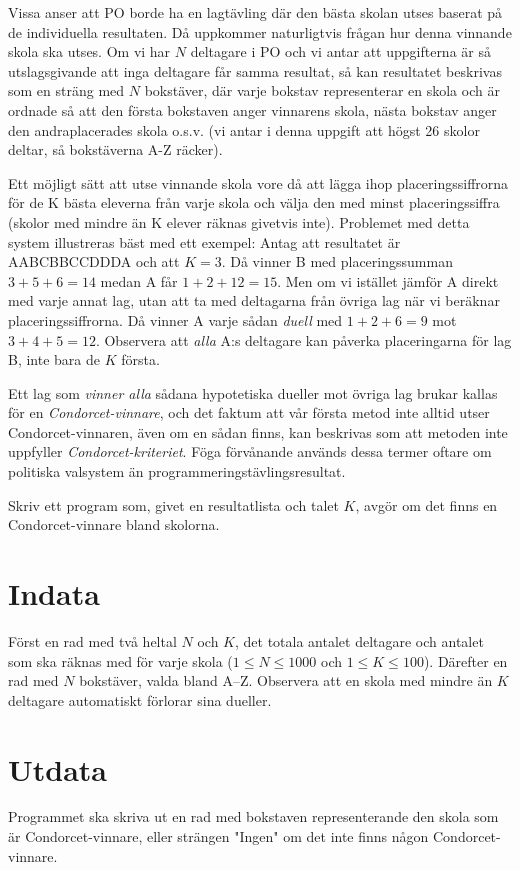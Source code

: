 
Vissa anser att PO borde ha en lagtävling där den bästa skolan utses baserat på de individuella resultaten. Då uppkommer naturligtvis frågan hur denna vinnande skola ska utses.
Om vi har $N$ deltagare i PO och vi antar att uppgifterna är så utslagsgivande att inga deltagare får samma resultat, så kan resultatet beskrivas som en sträng med $N$ bokstäver, där varje bokstav representerar en skola och är ordnade så att den första bokstaven anger vinnarens skola, nästa bokstav anger den andraplacerades skola o.s.v. (vi antar i denna uppgift att högst 26 skolor deltar, så bokstäverna A-Z räcker).

Ett möjligt sätt att utse vinnande skola vore då att lägga ihop placeringssiffrorna för de K bästa eleverna från varje skola och välja den med minst placeringssiffra (skolor med mindre än K elever räknas givetvis inte). Problemet med detta system illustreras bäst med ett exempel: Antag att resultatet är AABCBBCCDDDA
och att $K=3$. Då vinner B med placeringssumman $3+5+6=14$ medan A får $1+2+12=15$. Men om vi istället jämför A direkt med varje annat lag, utan att ta med deltagarna från övriga lag när vi beräknar placeringssiffrorna. Då vinner A varje sådan {\em duell} med $1+2+6=9$ mot $3+4+5=12$. Observera att {\em alla} A:s deltagare kan påverka placeringarna för lag B, inte bara de $K$ första.

Ett lag som {\em vinner alla} sådana hypotetiska dueller mot övriga lag brukar kallas för en {\em Condorcet-vinnare}, och det faktum att vår första metod inte alltid utser Condorcet-vinnaren, även om en sådan finns, kan beskrivas som att metoden inte uppfyller {\em Condorcet-kriteriet}. Föga förvånande används dessa termer oftare om politiska valsystem än programmeringstävlingsresultat.

Skriv ett program som, givet en resultatlista och talet $K$, avgör om det finns en Condorcet-vinnare bland skolorna.

\section*{Indata}

Först en rad med två heltal $N$ och $K$, det totala antalet deltagare och antalet som ska räknas med för varje skola ($1\le N \le 1000$ och $1\le K \le 100$). Därefter en rad med $N$ bokstäver, valda bland A--Z. Observera att en skola med mindre än $K$ deltagare automatiskt förlorar sina dueller.

\section*{Utdata}

Programmet ska skriva ut en rad med bokstaven representerande den skola som är Condorcet-vinnare, eller strängen "Ingen" om det inte finns någon Condorcet-vinnare.
